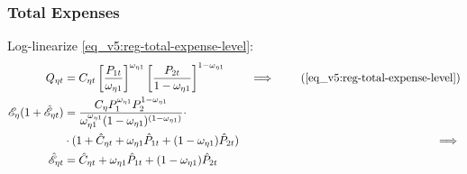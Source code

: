 \documentclass[../thesis.tex]{subfiles}
\begin{document}


\subsubsection*{Total Expenses}

Log-linearize \ref{eq_v5:reg-total-expense-level}:
	\begin{alignat}{2}
		Q_{\eta t} &= C_{\eta t} \left[ \frac{P_{1 t}}{\omega_{\eta 1}} \right]^{\omega_{\eta 1}} \left[ \frac{P_{2 t}}{1 -\omega_{\eta 1}} \right]^{1 -\omega_{\eta 1}} &\implies \tag{\ref{eq_v5:reg-total-expense-level}} \\
		\te[] (1 + \hat{\mathscr{E}}_{\eta t}) &= \frac{C_{\eta} P_{1}^{\omega_{\eta 1}} P_{2}^{1 -\omega_{\eta 1}}}{\omega_{\eta 1}^{\omega_{\eta 1}} (1 - \omega_{\eta 1})^{(1 - \omega_{\eta 1})}} \cdot \nonumber \\
		 \qquad &\cdot (1 + \hat{C}_{\eta t} + \omega_{\eta 1} \hat{P}_{1 t} + (1 -\omega_{\eta 1}) \hat{P}_{2 t}) &\implies \nonumber \\
		\hat{\mathscr{E}}_{\eta t} &= \hat{C}_{\eta t} + \omega_{\eta 1} \hat{P}_{1 t} + (1 -\omega_{\eta 1}) \hat{P}_{2 t} \label{eq_v5:reg-ll-total-expense-level}
	\end{alignat}


\begin{comment}
	
Isolate $\hat{\mathscr{E}}_{\eta t}$ in \ref{eq_v5:reg-ll-regional-consumption-and-prices} and substitute in \ref{eq_v5:reg-ll-total-expense-level}:
\begin{align}
	\hat{C}_{\eta 1 t} &= \hat{\mathscr{E}}_{\eta t} - \hat{P}_{\eta t} \iff \hat{\mathscr{E}}_{\eta t} = \hat{C}_{\eta 1 t} + \hat{P}_{\eta t} \tag{\ref{eq_v5:reg-ll-regional-consumption-and-prices}} \\
	\hat{C}_{\eta 1 t} + \hat{P}_{\eta t} &= \hat{C}_{\eta t} + \omega_{\eta 1} \hat{P}_{\eta t} + (1 -\omega_{\eta 1}) \hat{P}_{\nu t} \implies \nonumber \\
	\hat{C}_{\eta t} - \hat{C}_{\eta 1 t} &= (1 -\omega_{\eta 1}) (\hat{P}_{\eta t} - \hat{P}_{\nu t}) \label{eq_v5:reg-ll-total-expense-level-2}
\end{align}

Equation \ref{eq_v5:reg-ll-total-expense-level-2} shows that the distance between the regional consumption and the good $\eta$ consumption is proportional to the distance between the variations of both regional price levels.	
	
\end{comment}
\end{document}

